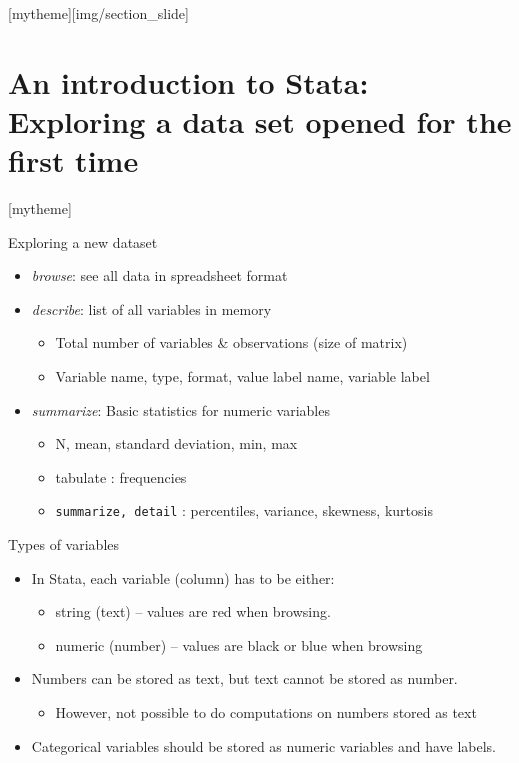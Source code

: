 \documentclass[aspectratio=169]{beamer}
\newcommand{\sectionpic}[2]{
	\setbeamertemplate{section page}[mytheme][#2]
	\section{#1}
	\setbeamertemplate{section page}[mytheme]
}
\begin{document}
\sectionpic{An introduction to Stata: \newline Exploring a data set opened for the first time}{img/section_slide}


\begin{frame}{Exploring a new dataset}
\begin{itemize}
\item {\protect\textit{browse}}: see all data in spreadsheet format
\item \textit {describe}: list of all variables in memory
	\begin{itemize}
		\item Total number of variables \& observations (size of matrix)
		\item Variable name, type, format, value label name, variable label
	\end{itemize}
\item \textit {summarize}: Basic statistics for numeric variables
	\begin{itemize}
		\item N, mean, standard deviation, min, max
		\item tabulate : frequencies
		\item \texttt{summarize, detail} : percentiles, variance, skewness, kurtosis
	\end{itemize}
\end{itemize}
\end{frame}


\begin{frame}{Types of variables}
\begin{itemize}
	\item In Stata, each variable (column) has to be either:
	\begin{itemize}
		\item string (text) – values are red when browsing.
		\item numeric (number) – values are black or blue when browsing
	\end{itemize}
	\item Numbers can be stored as text, but text cannot be stored as number. 
	\begin{itemize}
		\item 	However, not possible to do computations on numbers stored as text 
	\end{itemize}
	\item Categorical variables should be stored as numeric variables and have labels.
\end{itemize}
\end{frame}
\end{document}
